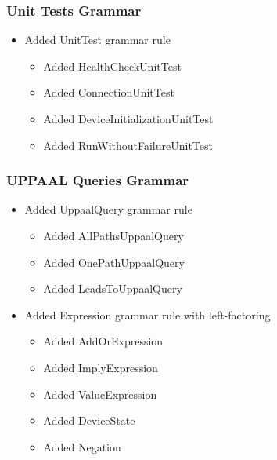 \hypertarget{unit-tests-grammar}{%
\subsubsection{Unit Tests Grammar}\label{unit-tests-grammar}}

\begin{itemize}
\tightlist
\item
  Added UnitTest grammar rule

  \begin{itemize}
  \tightlist
  \item
    Added HealthCheckUnitTest
  \item
    Added ConnectionUnitTest
  \item
    Added DeviceInitializationUnitTest
  \item
    Added RunWithoutFailureUnitTest
  \end{itemize}
\end{itemize}

\hypertarget{uppaal-queries-grammar}{%
\subsubsection{UPPAAL Queries Grammar}\label{uppaal-queries-grammar}}

\begin{itemize}
\tightlist
\item
  Added UppaalQuery grammar rule

  \begin{itemize}
  \tightlist
  \item
    Added AllPathsUppaalQuery
  \item
    Added OnePathUppaalQuery
  \item
    Added LeadsToUppaalQuery
  \end{itemize}
\item
  Added Expression grammar rule with left-factoring

  \begin{itemize}
  \tightlist
  \item
    Added AddOrExpression
  \item
    Added ImplyExpression
  \item
    Added ValueExpression
  \item
    Added DeviceState
  \item
    Added Negation
  \end{itemize}
\end{itemize}

